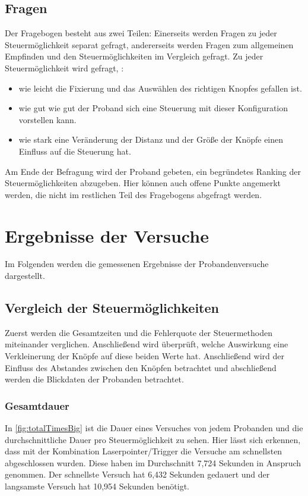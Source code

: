 \subsection{Fragen}
Der Fragebogen besteht aus zwei Teilen: Einerseits werden Fragen zu jeder Steuermöglichkeit separat gefragt, andererseits werden Fragen zum allgemeinen Empfinden und den Steuermöglichkeiten im Vergleich gefragt.
Zu jeder Steuermöglichkeit wird gefragt, :
\begin{itemize}
	\item wie leicht die Fixierung und das Auswählen des richtigen Knopfes gefallen ist.
	\item wie gut wie gut der Proband sich eine Steuerung mit dieser Konfiguration vorstellen kann.
	\item wie stark eine Veränderung der Distanz und der Größe der Knöpfe einen Einfluss auf die Steuerung hat.
\end{itemize}
Am Ende der Befragung wird der Proband gebeten, ein begründetes Ranking der Steuermöglichkeiten abzugeben. Hier können auch offene Punkte angemerkt werden, die nicht im restlichen Teil des Fragebogens abgefragt werden.


\section{Ergebnisse der Versuche}
\label{section:results}
Im Folgenden werden die gemessenen Ergebnisse der Probandenversuche dargestellt. 
\subsection{Vergleich der Steuermöglichkeiten}
\label{section:comparison}
Zuerst werden die Gesamtzeiten und die Fehlerquote der Steuermethoden miteinander verglichen. Anschließend wird überprüft, welche Auswirkung eine Verkleinerung der Knöpfe auf diese beiden Werte hat. Anschließend wird der Einfluss des Abstandes zwischen den Knöpfen betrachtet und abschließend werden die Blickdaten der Probanden betrachtet.
\subsubsection{Gesamtdauer}
In \autoref{fig:totalTimesBig} ist die Dauer eines Versuches von jedem Probanden und die durchschnittliche Dauer pro Steuermöglichkeit zu sehen. Hier lässt sich erkennen, dass mit der Kombination Laserpointer/Trigger die Versuche am schnellsten abgeschlossen wurden. Diese haben im Durchschnitt 7,724 Sekunden in Anspruch genommen. Der schnellste Versuch hat 6,432 Sekunden gedauert und der langsamste Versuch hat 10,954 Sekunden benötigt.

